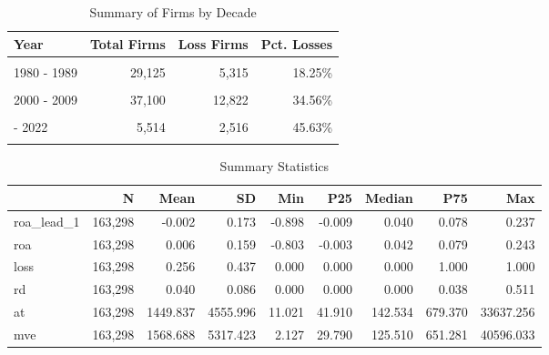 \documentclass[
  authoryear,
  preprint]{elsarticle}
\begin{document}
\begin{longtable}[t]{lrrr}

\caption{\label{tbl-frequency}Summary of Firms by Decade}

\tabularnewline

\toprule
Year & Total Firms & Loss Firms & Pct. Losses\\
\midrule
\cellcolor{gray!10}{1970 - 1979} & \cellcolor{gray!10}{25,101} & \cellcolor{gray!10}{1,978} & \cellcolor{gray!10}{7.88\%}\\
1980 - 1989 & 29,125 & 5,315 & 18.25\%\\
\cellcolor{gray!10}{1990 - 1999} & \cellcolor{gray!10}{38,024} & \cellcolor{gray!10}{9,579} & \cellcolor{gray!10}{25.19\%}\\
2000 - 2009 & 37,100 & 12,822 & 34.56\%\\
\cellcolor{gray!10}{2010 - 2019} & \cellcolor{gray!10}{28,434} & \cellcolor{gray!10}{9,671} & \cellcolor{gray!10}{34.01\%}\\
\addlinespace
2020 - 2022 & 5,514 & 2,516 & 45.63\%\\
\cellcolor{gray!10}{Total} & \cellcolor{gray!10}{163,298} & \cellcolor{gray!10}{41,881} & \cellcolor{gray!10}{25.65\%}\\
\bottomrule

\end{longtable}

\begin{longtable}[t]{lrrrrrrrr}

\caption{\label{tbl-descriptive}Summary Statistics}

\tabularnewline

\toprule
 & N & Mean & SD & Min & P25 & Median & P75 & Max\\
\midrule
roa\_lead\_1 & 163,298 & -0.002 & 0.173 & -0.898 & -0.009 & 0.040 & 0.078 & 0.237\\
roa & 163,298 & 0.006 & 0.159 & -0.803 & -0.003 & 0.042 & 0.079 & 0.243\\
loss & 163,298 & 0.256 & 0.437 & 0.000 & 0.000 & 0.000 & 1.000 & 1.000\\
rd & 163,298 & 0.040 & 0.086 & 0.000 & 0.000 & 0.000 & 0.038 & 0.511\\
at & 163,298 & 1449.837 & 4555.996 & 11.021 & 41.910 & 142.534 & 679.370 & 33637.256\\
\addlinespace
mve & 163,298 & 1568.688 & 5317.423 & 2.127 & 29.790 & 125.510 & 651.281 & 40596.033\\
\bottomrule

\end{longtable}
\end{document}
